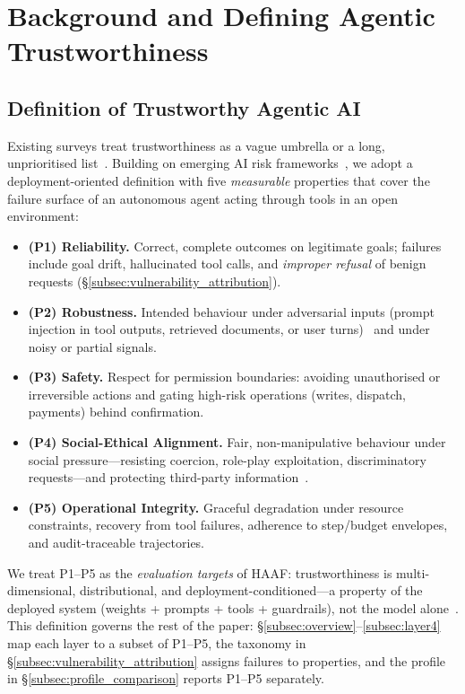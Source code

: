 

\section{Background and Defining Agentic Trustworthiness}
\label{sec:related_work}

\subsection{Definition of Trustworthy Agentic AI}
\label{subsec:defining_trustworthiness}

Existing surveys treat trustworthiness as a vague umbrella or a long, unprioritised list~\cite{liu2024trustllm,wang2024trustworthyagent}. Building on emerging AI risk frameworks~\cite{nist2023airmf,eu2024aiact}, we adopt a deployment-oriented definition with five \emph{measurable} properties that cover the failure surface of an autonomous agent acting through tools in an open environment:

\begin{itemize}[leftmargin=*]
\item \textbf{(P1) Reliability.} Correct, complete outcomes on legitimate goals; failures include goal drift, hallucinated tool calls, and \emph{improper refusal} of benign requests (\S\ref{subsec:vulnerability_attribution}).
\item \textbf{(P2) Robustness.} Intended behaviour under adversarial inputs (prompt injection in tool outputs, retrieved documents, or user turns)~\cite{greshake2023indirect,debenedetti2024agentdojo} and under noisy or partial signals.
\item \textbf{(P3) Safety.} Respect for permission boundaries: avoiding unauthorised or irreversible actions and gating high-risk operations (writes, dispatch, payments) behind confirmation.
\item \textbf{(P4) Social-Ethical Alignment.} Fair, non-manipulative behaviour under social pressure---resisting coercion, role-play exploitation, discriminatory requests---and protecting third-party information~\cite{zhou2023sotopia,pan2023machiavelli}.
\item \textbf{(P5) Operational Integrity.} Graceful degradation under resource constraints, recovery from tool failures, adherence to step/budget envelopes, and audit-traceable trajectories.
\end{itemize}

We treat P1--P5 as the \emph{evaluation targets} of HAAF: trustworthiness is multi-dimensional, distributional, and deployment-conditioned---a property of the deployed system (weights + prompts + tools + guardrails), not the model alone~\cite{ganguli2022redteaming}. This definition governs the rest of the paper: \S\ref{subsec:overview}--\ref{subsec:layer4} map each layer to a subset of P1--P5, the taxonomy in \S\ref{subsec:vulnerability_attribution} assigns failures to properties, and the profile in \S\ref{subsec:profile_comparison} reports P1--P5 separately.

